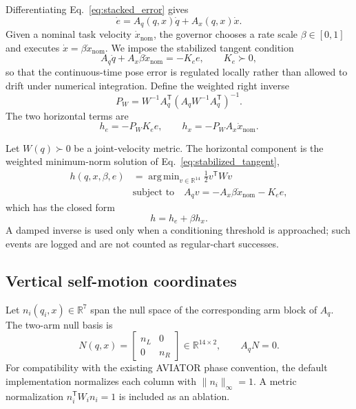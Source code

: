 \documentclass[preprint,12pt]{elsarticle}
\DeclareMathOperator*{\argmin}{arg\,min}
\newcommand{\R}{\mathbb{R}}
\newcommand{\T}{^{\mathsf T}}
\begin{document}
Differentiating Eq.~\eqref{eq:stacked_error} gives
\begin{equation}
\dot e
=
A_q(q,x)\dot q+A_x(q,x)\dot x.
\label{eq:error_dynamics}
\end{equation}
Given a nominal task velocity $\dot x_{\mathrm{nom}}$, the governor chooses a rate scale $\beta\in[0,1]$ and executes $\dot x=\beta\dot x_{\mathrm{nom}}$. We impose the stabilized tangent condition
\begin{equation}
A_q\dot q+A_x\beta\dot x_{\mathrm{nom}}=-K_e e,
\qquad K_e\succ0,
\label{eq:stabilized_tangent}
\end{equation}
so that the continuous-time pose error is regulated locally rather than allowed to drift under numerical integration. Define the weighted right inverse
\begin{equation}
P_W=W^{-1}A_q\T\left(A_qW^{-1}A_q\T\right)^{-1}.
\label{eq:weighted_right_inverse}
\end{equation}
The two horizontal terms are
\begin{equation}
h_e=-P_WK_e e,
\qquad
h_x=-P_WA_x\dot x_{\mathrm{nom}}.
\label{eq:horizontal_terms}
\end{equation}

Let $W(q)\succ0$ be a joint-velocity metric. The horizontal component is the weighted minimum-norm solution of Eq.~\eqref{eq:stabilized_tangent},
\begin{equation}
\begin{aligned}
h(q,x,\beta,e)
&=
\argmin_{v\in\R^{14}}\frac{1}{2}v\T Wv\\
&\text{subject to}\quad
A_qv=-A_x\beta\dot x_{\mathrm{nom}}-K_e e,
\end{aligned}
\label{eq:horizontal_qp}
\end{equation}
which has the closed form
\begin{equation}
h=h_e+\beta h_x.
\label{eq:horizontal_closed_form}
\end{equation}
A damped inverse is used only when a conditioning threshold is approached; such events are logged and are not counted as regular-chart successes.

\subsection{Vertical self-motion coordinates}

Let $n_i(q_i,x)\in\R^7$ span the null space of the corresponding arm block of $A_q$. The two-arm null basis is
\begin{equation}
N(q,x)
=
\begin{bmatrix}
 n_L&0\\
 0&n_R
\end{bmatrix}
\in\R^{14\times2},
\qquad
A_qN=0.
\label{eq:null_basis}
\end{equation}
For compatibility with the existing AVIATOR phase convention, the default implementation normalizes each column with $\|n_i\|_\infty=1$. A metric normalization $n_i\T W_in_i=1$ is included as an ablation.
\end{document}
